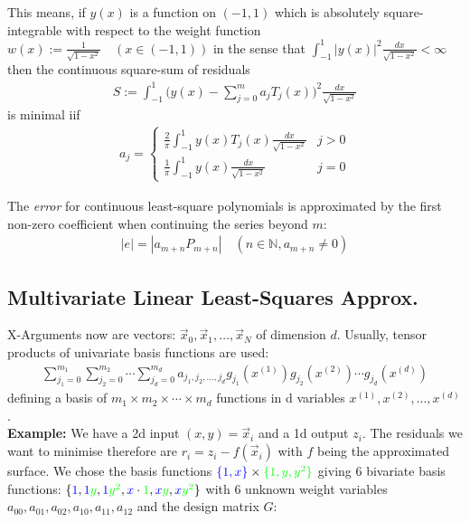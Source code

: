 This means, if $y(x)$ is a function on $(-1,1)$ which is absolutely square-integrable with respect to the
weight function $w(x):={\frac{1}{\sqrt{1-x^{2}}}}\quad(x\in(-1,1))$ in the sense that
$\int_{-1}^1|y(x)|^{2}{\frac{d x}{{\sqrt{1-x^{2}}}}<\infty}$
then the continuous square-sum of residuals
\begin{align*}
    S := \int_{-1}^1\biggl(y(x)-\sum_{j=0}^{m}a_{j}T_{j}(x)\biggr)^{2}\frac{d x}{\sqrt{1-x^{2}}}
\end{align*}
is minimal iif
\begin{align*}
    a_{j} =
    \left\{
    \begin{matrix}
        \frac{2}{\pi}\int_{-1}^{1}y(x)T_{j}(x)\frac{d x}{\sqrt{1-x^{2}}} & j > 0 \\
        \frac{1}{\pi}\int_{-1}^{1}y(x)\frac{d x}{\sqrt{1-x^{2}}}         & j = 0
    \end{matrix}
    \right.
\end{align*}

The \emph{error} for continuous least-square polynomials is approximated by the \colorbox{shadecolor}{first non-zero coefficient}
when continuing the series beyond $m$:
\begin{align*}
    |e| = |a_{m+n}P_{m+n}|\quad (n\in\mathbb{N}, a_{m+n}\neq 0)
\end{align*}

\subsection{Multivariate Linear Least-Squares Approx.}

X-Arguments now are vectors:
$\vec{x}_0, \vec{x}_1, \ldots, \vec{x}_N$ of dimension $d$.
Usually, tensor products of univariate basis functions are used:
\begin{align*}
    \sum_{j_1=0}^{m_1} \sum_{j_2=0}^{m_2}\cdots \sum_{j_d=0}^{m_d}
    a_{j_1, j_2, \ldots, j_d}g_{j_1}(x^{(1)})g_{j_2}(x^{(2)})\cdots g_{j_d}(x^{(d)})
\end{align*}
defining a basis of $m_1\times m_2\times \cdots \times m_d$ functions in d variables $x^{(1)}, x^{(2)},...,x^{(d)}$.
\\[1em]
\textbf{Example:}
We have a 2d input $(x,y)=\vec{x}_i$ and a 1d output $z_i$.
The residuals we want to minimise therefore are $r_i=z_i-f(\vec{x}_i)$ with $f$ being the approximated surface.
We chose the basis functions ${\color{blue}\{1, x\}}\times{\color{green}\{1, y, y^2\}}$ giving 6 bivariate basis functions:
$\{{\color{blue}1}, {\color{blue}1}{\color{green}y}, {\color{blue}1}{\color{green}y^2},
    {\color{blue}x}\cdot{\color{green}1}, {\color{blue}x}{\color{green}y}, {\color{blue}x}{\color{green}y^2}
\}$ with 6 unknown weight variables $a_{00}, a_{01}, a_{02}, a_{10}, a_{11}, a_{12}$ and the design matrix $G$:

